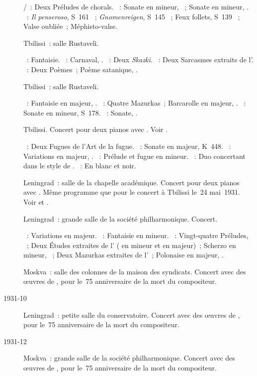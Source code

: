 \begin{description}
 \textsc{\JBach{}/\Busoni{}}~: Deux Préludes de chorals.
 \textsc{\Beethoven{}}~: Sonate en \kC mineur, ~; Sonate en \kC
 \Sharp mineur,  .
 \textsc{\Liszt{}}~: \emph{Il penseroso}, S~161 ~;
 \emph{Gnomenreigen}, S~145 ~; Feux follets, S~139 ~;
 Valse oubliée~; Méphisto-valse.
 \item[\DateWithWeekDay{1931-05-21}]
 Tbilissi~: salle Rustaveli.

 \textsc{\Mozart{}}~: Fantaisie.
 \textsc{\Schumann{}}~: Carnaval, .
 \textsc{\Medtner{}}~: Deux \emph{Skazki}.
 \textsc{\Prokofiev{}}~: Deux Sarcasmes extraits de l'.
 \textsc{\Scriabine{}}~: Deux Poèmes~; Poème satanique, .
 \item[\DateWithWeekDay{1931-05-22}]
 Tbilissi~: salle Rustaveli.

 \textsc{\Schumann{}}~: Fantaisie en \kC majeur, .
 \textsc{\Chopin{}}~: Quatre Mazurkas~; Barcarolle en \kF \Sharp majeur,
 .
 \textsc{\Liszt{}}~: Sonate en \kB mineur, S~178.
 \textsc{\Scriabine{}}~: Sonate, .
 \item[\DateWithWeekDay{1931-05-24}]
 Tbilissi.
 Concert pour deux pianos avec \MYudina{}.
 Voir \citet{Yudina02}.

 \textsc{\JBach{}}~: Deux Fugues de l'\hbox{Art} de la fugue.
 \textsc{\Mozart{}}~: Sonate en \kD majeur, K~448.
 \textsc{\Schumann{}}~: Variations en \kB \Flat majeur, .
 \textsc{\Taneiev{}}~: Prélude et fugue en \kG \Sharp mineur.
 \textsc{\Busoni{}}~: Duo concertant dans le style de \Mozart{}.
 \textsc{\Debussy{}}~: En blanc et noir.
 \item[\DateWithWeekDay{1931-06-20}]
 Leningrad~: salle de la chapelle académique.
 Concert pour deux pianos avec \MYudina{}.
 Même programme que pour le concert à Tbilissi le~24 mai~1931.
 Voir \citet[p.~46 et note~4]{White} et \citet[p.~403]{Scriabine}.
 \item[\DateWithWeekDay{1931-10-08}]
 Leningrad~: grande salle de la société philharmonique.
 Concert.

 \textsc{\Haendel{}}~: Variations en \kE majeur.
 \textsc{\Mozart{}}~: Fantaisie en \kC mineur.
 \textsc{\Chopin{}}~: Vingt-quatre Préludes, ~; Deux Études
 extraites de l' ( en \kE \Flat mineur et  en
 \kG \Flat majeur)~; Scherzo  en \kC \Sharp mineur, ~;
 Deux Mazurkas extraites de l'~; Polonaise en \kA \Flat majeur,
 .
 \item[\DateWithWeekDay{1931-10-11}]
 Moskva~: salle des colonnes de la maison des syndicats.
 Concert avec des œuvres de \Schumann{}, pour le~75\ieme{} anniversaire de
 la mort du compositeur.
 \item[1931-10]
 Leningrad~: petite salle du conservatoire.
 Concert avec des œuvres de \Schumann{}, pour le~75\ieme{} anniversaire de
 la mort du compositeur.
 \item[1931-12]
 Moskva~: grande salle de la société philharmonique.
 Concert avec des œuvres de \Schumann{}, pour le~75\ieme{} anniversaire de
 la mort du compositeur.


\end{description}

